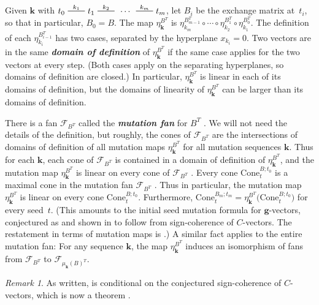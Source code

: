 \documentclass{amsart}
\theoremstyle{definition}
\theoremstyle{remark}
\newtheorem{remark}[proposition]{Remark}
\numberwithin{equation}{section}
\newcommand{\newword}[1]{\textbf{\emph{#1}}}
\newcommand{\edge}{\,\,\rule[2.7pt]{20pt}{0.5pt}\,\,}
\newcommand{\F}{{\mathcal F}}
\newcommand{\0}{{\mathbf{0}}}
\newcommand{\Cone}{\mathrm{Cone}}
\newcommand{\g}{\mathbf{g}}
\newcommand{\kk}{{\boldsymbol{k}}}
\begin{document}
Given $\kk$ with $t_0\overset{k_1}{\edge}t_1\overset{k_2}{\edge}\,\cdots\,\overset{k_m}{\edge}t_m$, let $B_i$ be the exchange matrix at~$t_i$, so that in particular, $B_0=B$.
The map $\eta_{\kk}^{B^T}$ is ${\eta_{k_m}^{B_{m-1}^T}\circ\cdots\circ\eta_{k_2}^{B_1^T}\circ\eta_{k_1}^{B_0^T}}$.
The definition of each $\eta_{k_i}^{B_{i-1}^T}$ has two cases, separated by the hyperplane $x_{k_i}=0$.
Two vectors are in the same \newword{domain of definition} of $\eta_\kk^{B^T}$ if the same case applies for the two vectors at every step.
(Both cases apply on the separating hyperplanes, so domains of definition are closed.)
In particular, $\eta_\kk^{B^T}$ is linear in each of its domains of definition, but the domains of linearity of $\eta_\kk^{B^T}$ can be larger than its domains of definition.

There is a fan $\F_{B^T}$ called the \newword{mutation fan} for $B^T$ \cite[Definition~5.12]{universal}.
We will not need the details of the definition, but roughly, the cones of $\F_{B^T}$ are the intersections of domains of definition of all mutation maps $\eta_\kk^{B^T}$ for all mutation sequences $\kk$.
Thus for each $\kk$, each cone of $\F_{B^T}$ is contained in a domain of definition of $\eta_\kk^{B^T}$, and the mutation map $\eta_\kk^{B^T}$ is linear on every cone of $\F_{B^T}$ \cite[Proposition~5.3]{universal}.
Every cone $\Cone^{B;t_0}_t$ is a maximal cone in the mutation fan $\F_{B^T}$ \cite[Proposition~8.13]{universal}.
Thus in particular, the mutation map $\eta_\kk^{B^T}$ is linear on every cone $\Cone^{B;t_0}_t$.
Furthermore, $\Cone_t^{B_m;t_m}=\eta_\kk^{B^T}\bigl(\Cone_t^{B;t_0}\bigr)$ for every seed~$t$.
(This amounts to the initial seed mutation formula for $\g$-vectors, conjectured as \cite[Conjecture~7.12]{FZ07} and shown in \cite[Proposition~4.2(v)]{NZ12} to follow from sign-coherence of $C$-vectors.
The restatement in terms of mutation maps is \cite[Conjecture~8.11]{universal}.)
A similar fact applies to the entire mutation fan:
For any sequence $\kk$, the map $\eta_\kk^{B^T}$ induces an isomorphism of fans \cite[Proposition~7.3]{universal} from $\F_{B^T}$ to $\F_{\mu_\kk(B)^T}$.

\begin{remark}\label{conditional}
As written, \cite[Proposition~8.13]{universal} is conditional on the conjectured sign-coherence of $C$-vectors, which is now a theorem \cite[Corollary~5.5]{GHKK18}.
\end{remark}
\end{document}
